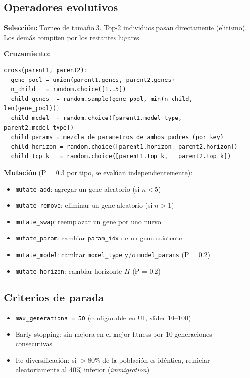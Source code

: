 \documentclass[12pt,letterpaper]{article}
\begin{document}
\subsection{Operadores evolutivos}

\textbf{Selección:} Torneo de tamaño 3. Top-2 individuos pasan directamente
(elitismo). Los demás compiten por los restantes lugares.

\medskip
\textbf{Cruzamiento:}
\begin{lstlisting}
cross(parent1, parent2):
  gene_pool = union(parent1.genes, parent2.genes)
  n_child   = random.choice([1..5])
  child_genes  = random.sample(gene_pool, min(n_child, len(gene_pool)))
  child_model  = random.choice([parent1.model_type, parent2.model_type])
  child_params = mezcla de parametros de ambos padres (por key)
  child_horizon = random.choice([parent1.horizon, parent2.horizon])
  child_top_k   = random.choice([parent1.top_k,   parent2.top_k])
\end{lstlisting}

\textbf{Mutación} (P = 0.3 por tipo, se evalúan independientemente):

\begin{itemize}[leftmargin=2em]
  \item \texttt{mutate\_add}:   agregar un gene aleatorio (si $n < 5$)
  \item \texttt{mutate\_remove}: eliminar un gene aleatorio (si $n > 1$)
  \item \texttt{mutate\_swap}:  reemplazar un gene por uno nuevo
  \item \texttt{mutate\_param}: cambiar \texttt{param\_idx} de un gene existente
  \item \texttt{mutate\_model}: cambiar \texttt{model\_type} y/o \texttt{model\_params} (P = 0.2)
  \item \texttt{mutate\_horizon}: cambiar horizonte $H$ (P = 0.2)
\end{itemize}

\subsection{Criterios de parada}

\begin{itemize}[leftmargin=2em]
  \item \texttt{max\_generations = 50} (configurable en UI, slider 10--100)
  \item Early stopping: sin mejora en el mejor fitness por 10 generaciones consecutivas
  \item Re-diversificación: si $>80\%$ de la población es idéntica, reiniciar
        aleatoriamente al 40\% inferior (\emph{immigration})
\end{itemize}
\end{document}

